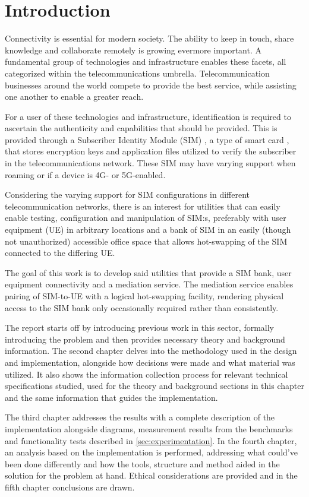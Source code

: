 \chapter{Introduction}

Connectivity is essential for modern society. The ability to keep in
touch, share knowledge and collaborate remotely is growing evermore
important. A fundamental group of technologies and infrastructure
enables these facets, all categorized within the telecommunications
umbrella. Telecommunication businesses around the world compete to
provide the best service, while assisting one another to enable a
greater reach.

For a user of these technologies and infrastructure, identification
is required to ascertain the authenticity and capabilities that
should be provided. This is provided through a Subscriber Identity
Module (SIM) \cite{etsi-ts-131-102}, a type of smart card \cite{etsi-ts-102-221},
that stores encryption keys and application files utilized to verify
the subscriber in the telecommunications network. These SIM may have
varying support when roaming or if a device is 4G- or 5G-enabled.

Considering the varying support for SIM configurations in different
telecommunication networks, there is an interest for utilities that
can easily enable testing, configuration and manipulation of SIM:s,
preferably with user equipment (UE) in arbitrary locations and a bank
of SIM in an easily (though not unauthorized) accessible office space
that allows hot-swapping of the SIM connected to the differing UE.

The goal of this work is to develop said utilities that provide a
SIM bank, user equipment connectivity and a mediation service. The
mediation service enables pairing of SIM-to-UE with a logical
hot-swapping facility, rendering physical access to the SIM bank
only occasionally required rather than consistently.

The report starts off by introducing previous work in this sector,
formally introducing the problem and then provides necessary theory
and background information. The second chapter delves into the
methodology used in the design and implementation, alongside how
decisions were made and what material was utilized. It also shows
the information collection process for relevant technical
specifications studied, used for the theory and background sections
in this chapter and the same information that guides the
implementation.

The third chapter addresses the results with a complete description
of the implementation alongside diagrams, measurement results from
the benchmarks and functionality tests described in \ref{sec:experimentation}.
In the fourth chapter, an analysis based on the implementation is
performed, addressing what could've been done differently and how
the tools, structure and method aided in the solution for the
problem at hand. Ethical considerations are provided and in the
fifth chapter conclusions are drawn.

